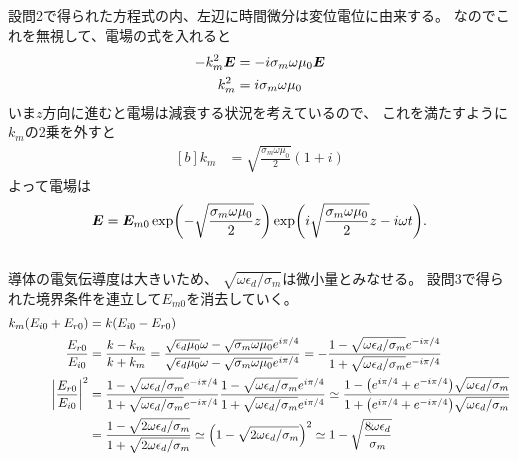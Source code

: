 \documentclass[../../master.tex]{subfiles}
\begin{document}
\subsection{}
設問2で得られた方程式の内、左辺に時間微分は変位電位に由来する。
なのでこれを無視して、電場の式を入れると
\begin{equation}\begin{aligned}[b]
    -k_m^2 \vb*{E} &= -i\sigma_m\omega \mu_0 \vb*{E}\\
    k_m^2 &= i\sigma_m\omega\mu_0
\end{aligned}\end{equation}
いま\(z\)方向に進むと電場は減衰する状況を考えているので、
これを満たすように\(k_m\)の2乗を外すと
\begin{equation}\begin{aligned}[b]
    k_m &= \sqrt{\frac{\sigma_m \omega \mu_0}{2}}(1+i)
\end{aligned}\end{equation}
よって電場は
\begin{equation}\begin{aligned}[b]
    \vb*{E} = \vb*{E}_{m0}\exp(-\sqrt{\frac{\sigma_m \omega \mu_0}{2}}z)\exp(i\sqrt{\frac{\sigma_m \omega \mu_0}{2}}z-i\omega t).
\end{aligned}\end{equation}

\subsection{}
導体の電気伝導度は大きいため、
\(\sqrt{\omega\epsilon_d/\sigma_m}\)は微小量とみなせる。
設問3で得られた境界条件を連立して\(E_{m0}\)を消去していく。
\begin{equation}\begin{aligned}[b]
    k_m(E_{i0}+E_{r0})&=k(E_{i0}-E_{r0})\\
    \frac{E_{r0}}{E_{i0}} &= \frac{k-k_m}{k+k_m}
    =\frac{\sqrt{\epsilon_d\mu_0}\omega-\sqrt{\sigma_m\omega\mu_0}e^{i\pi/4}}{\sqrt{\epsilon_d\mu_0}\omega-\sqrt{\sigma_m\omega\mu_0}e^{i\pi/4}}
    = - \frac{1-\sqrt{\omega\epsilon_d/\sigma_m}e^{-i\pi/4}}{1+\sqrt{\omega\epsilon_d/\sigma_m}e^{-i\pi/4}}\\
    \abs{\frac{E_{r0}}{E_{i0}}}^2
    &= \frac{1-\sqrt{\omega\epsilon_d/\sigma_m}e^{-i\pi/4}}{1+\sqrt{\omega\epsilon_d/\sigma_m}e^{-i\pi/4}}
    \frac{1-\sqrt{\omega\epsilon_d/\sigma_m}e^{i\pi/4}}{1+\sqrt{\omega\epsilon_d/\sigma_m}e^{i\pi/4}}
    \simeq \frac{1-\qty(e^{i\pi/4}+e^{-i\pi/4})\sqrt{\omega\epsilon_d/\sigma_m}}{1+\qty(e^{i\pi/4}+e^{-i\pi/4})\sqrt{\omega\epsilon_d/\sigma_m}}\\
    &=\frac{1-\sqrt{2\omega\epsilon_d/\sigma_m}}{1+\sqrt{2\omega\epsilon_d/\sigma_m}}
    \simeq \qty(1-\sqrt{2\omega\epsilon_d/\sigma_m})^2
    \simeq 1-\sqrt{\frac{8\omega\epsilon_d}{\sigma_m}}
\end{aligned}\end{equation}
\end{document}
